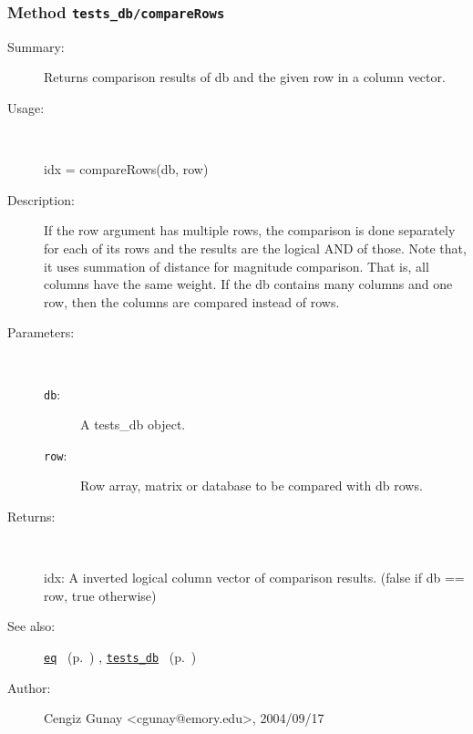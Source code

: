 \subsubsection[Method \texttt{compareRows}]{Method \texttt{tests\_db/compareRows}}%
%
\label{ref_tests_db__compareRows}%
\hypertarget{ref_tests_db__compareRows}{}%
\begin{description}
\item[Summary:]Returns comparison results of db and the given row in a column vector.
%
\item[Usage:]~%
\begin{lyxcode}%
idx = compareRows(db, row)
%
\end{lyxcode}%
%
\item[Description:]%
If the row argument has multiple rows, the comparison is done separately
 for each of its rows and the results are the logical AND of those.
 Note that, it uses summation of distance for magnitude comparison. 
 That is, all columns have the same weight. If the db contains many
 columns and one row, then the columns are compared instead of rows.
\item[Parameters:]~
\begin{description}%
\item[\texttt{db}:]
 A tests\_db object.
\item[\texttt{row}:]
 Row array, matrix or database to be compared with db rows.
\end{description}%
%
\item[Returns:]~

	idx: A inverted logical column vector of comparison results. 
		(false if db == row, true otherwise)
%
%
\item[See also:]%
\hyperlink{ref_eq}{\texttt{eq}}%
\ (p.~\pageref{ref_eq})%
%
, \hyperlink{ref_tests_db}{\texttt{tests\_db}}%
\ (p.~\pageref{ref_tests_db})%
%
%
\item[Author:]%
Cengiz Gunay <cgunay@emory.edu>, 2004/09/17%
\end{description}
\methodline%
